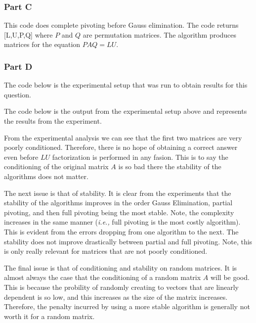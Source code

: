 \newpage
\subsubsection{Part C}

This code does complete pivoting before Gauss elimination.
The code returns [L,U,P,Q] where \(P\) and \(Q\) are permutation matrices.
The algorithm produces matrices for the equation \(PAQ = LU\). 



\newpage
\subsubsection{Part D}

The code below is the experimental setup that was run to obtain results for this question.



The code below is the output from the experimental setup above and represents the results from the experiment.



From the experimental analysis we can see that the first two matrices are very poorly conditioned.
Therefore, there is no hope of obtaining a correct answer even before \(LU\) factorization is performed in any fasion.
This is to say the conditioning of the original matrix \(A\) is so bad there the stability of the algorithms does not matter.

The next issue is that of stability.
It is clear from the experiments that the stability of the algorithms improves in the order Gauss Elimination, partial pivoting, and then full pivoting being the most stable.
Note, the complexity increases in the same manner ({\em i.e.,} full pivoting is the most costly algorithm).
This is evident from the errors dropping from one algorithm to the next.
The stability does not improve drastically between partial and full pivoting.
Note, this is only really relevant for matrices that are not poorly conditioned.

The final issue is that of conditioning and stability on random matrices.
It is almost always the case that the conditioning of a random matrix \(A\) will be good.
This is because the probility of randomly creating to vectors that are linearly dependent is so low, and this increases as the size of the matrix increases.
Therefore, the penalty incurred by using a more stable algorithm is generally not worth it for a random matrix.

